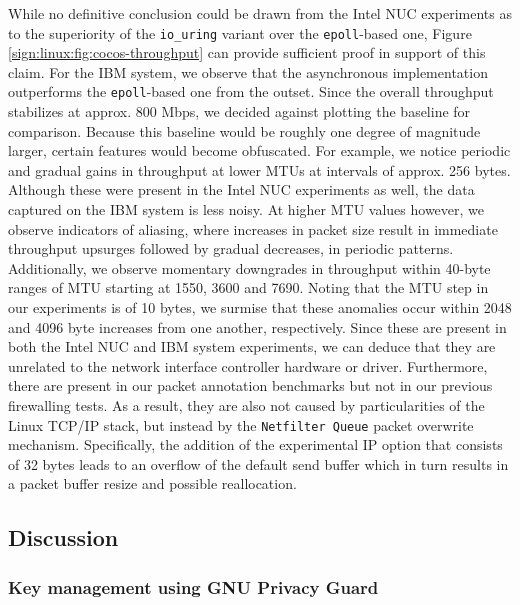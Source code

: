 While no definitive conclusion could be drawn from the Intel NUC experiments as to the superiority of the \texttt{io\_uring} variant over the \texttt{epoll}-based one, Figure \ref{sign:linux:fig:cocos-throughput} can provide sufficient proof in support of this claim. For the IBM system, we observe that the asynchronous implementation outperforms the \texttt{epoll}-based one from the outset. Since the overall throughput stabilizes at approx. 800 Mbps, we decided against plotting the baseline for comparison. Because this baseline would be roughly one degree of magnitude larger, certain features would become obfuscated. For example, we notice periodic and gradual gains in throughput at lower MTUs at intervals of approx. 256 bytes. Although these were present in the Intel NUC experiments as well, the data captured on the IBM system is less noisy. At higher MTU values however, we observe indicators of aliasing, where increases in packet size result in immediate throughput upsurges followed by gradual decreases, in periodic patterns. Additionally, we observe momentary downgrades in throughput within 40-byte ranges of MTU starting at 1550, 3600 and 7690. Noting that the MTU step in our experiments is of 10 bytes, we surmise that these anomalies occur within 2048 and 4096 byte increases from one another, respectively. Since these are present in both the Intel NUC and IBM system experiments, we can deduce that they are unrelated to the network interface controller hardware or driver. Furthermore, there are present in our packet annotation benchmarks but not in our previous firewalling tests. As a result, they are also not caused by particularities of the Linux TCP/IP stack, but instead by the \texttt{Netfilter Queue} packet overwrite mechanism. Specifically, the addition of the experimental IP option that consists of 32 bytes leads to an overflow of the default send buffer which in turn results in a packet buffer resize and possible reallocation.

\subsection{Discussion}
\label{sign:linux:discussion}

\subsubsection{Key management using GNU Privacy Guard}
\label{sign:linux:discussion:gpg}

